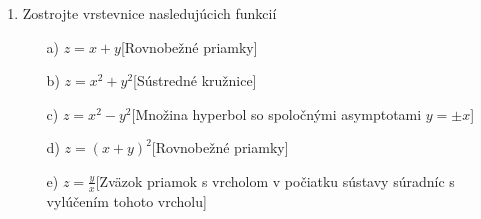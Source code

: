 \begin{enumerate}
\item Zostrojte vrstevnice nasledujúcich funkcií

\begin{enumerate}
\item[a)]{$z=x+y$}\hspace{\fill}[Rovnobežné priamky]
\item[b)]{$z=x^2+y^2$}\hspace{\fill}[Sústredné kružnice]
\item[c)]{$z=x^2-y^2$}\hspace{\fill}[Množina hyperbol so spoločnými asymptotami $y=\pm x$]
\item[d)]{$z=(x+y)^2$}\hspace{\fill}[Rovnobežné priamky]
\item[e)]{$z=\frac{y}{x}$}\hspace{\fill}[Zväzok priamok s vrcholom v počiatku sústavy súradníc s vylúčením tohoto vrcholu]
\end{enumerate}


\end{enumerate}